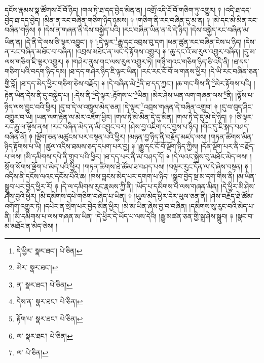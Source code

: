 དངོས་རྣམས་སྣ་ཚོགས་ངོ་བོ་ཉིད། །གལ་ཏེ་ཐ་དད་བྱེད་མིན་ན། །འགྲོ་འདི་ངོ་བོ་གཅིག་ཏུ་འགྱུར། ༈ །འདི་ཐ་དད་བྱེད་ཐ་དད་བྱེད། །མིན་ན་རང་བཞིན་གཅིག་ཉིད་ཉམས། ༈ །གཅིག་ནི་རང་བཞིན་དུ་མ་ན། ༈ །མེ་དང་མེ་མིན་རང་བཞིན་གཉིས། ༈ །དེས་ན་གཞན་ནི་དེས་བསྐྱེད་པའི། །རང་བཞིན་ཡིན་ན་དེ་དེ་ཉིད། །དེས་བསྐྱེད་རང་བཞིན་མ་ཡིན་ན། །དེ་ནི་དེ་ལས་ཅི་ལྟར་འབྱུང་། ༈ །:དེ་ལྟར་\footnote{དེ་ཕྱིར་  སྣར་ཐང་།  པེ་ཅིན། }རྒྱུ་དང་འབྲས་བུ་དག །ཕན་ཚུན་རང་བཞིན་ངེས་པ་ཉིད། །དེས་ན་རང་བཞིན་མཐོང་བ་བཞིན། །འབྲས་མཐོང་ན་ཡང་དེ་རྟོགས་འགྱུར། ༈ །ཆུ་དང་འོ་མ་རུལ་འགྱུར་བཞིན། །དུ་མ་ལས་གཅིག་ཇི་ལྟར་འགྱུར། ༈ །གཤེར་ནུས་གང་ལས་རུལ་འགྱུར་ཏེ། །གཉི་གའང་གཅིག་ཉིད་ཅི་འདི་ནི། །ཐ་དད་གཅིག་པའི་བདག་ཉིད་དམ། །ཐ་དད་གཤེར་ཉིད་ཇི་ལྟར་ཡིན། །རང་རང་ངོ་བོ་ལ་གནས་ཕྱིར། །དེ་ཡི་རང་བཞིན་ཅན་གྱི་བློ། །ཐ་དད་མེད་ཕྱིར་གཅིག་ཅེས་བརྗོད། ༈ །དེ་བཞིན་མེ་\footnote{མེར་  སྣར་ཐང་། }ནི་ཐ་དད་ཀྱང་། །ཆ་གང་གིས་ནི་\footnote{ན་  སྣར་ཐང་།  པེ་ཅིན། }མེར་རྟོགས་པའི། །རྟེན་ཡིན་དེས་ནི་དུ་བསྐྱེད་པ། །:དེས་ནི་\footnote{དེས་ན་  སྣར་ཐང་།  པེ་ཅིན། }དེ་ལྟར་:རྟོགས་པ་\footnote{རྟོག་པ་  སྣར་ཐང་།  པེ་ཅིན། }ཡིན། །མེར་ཤེས་ཡན་ལག་གཞན་ལས་\footnote{ལ་  སྣར་ཐང་།  པེ་ཅིན། }ནི། །ལྟོས་པ་ཉིད་ལས་བྱུང་བའི་ཕྱིར། །དུ་བ་དེ་ལ་འཁྲུལ་མེད་ཅན། །དེ་ལྟར་\footnote{ལ་  པེ་ཅིན། }འབྲས་གཞན་དེ་བཞིན་འགྲུབ། ༈ །དུ་བ་བུད་ཤིང་འགྱུར་བ་ཡི། །ཡན་ལག་རྟེན་ལ་མེར་འཇོག་ཕྱིར། །གལ་ཏེ་མེ་མིན་དེ་དུ་མིན། །གལ་ཏེ་དེ་དུ་མེ་དེ་ཉིད། ༈ །ཅི་ལྟར་རང་རྒྱུ་ལ་ལྟོས་ནས། །རང་བཞིན་མེད་ན་མི་འབྱུང་བར། །ཤེས་བྱ་འཇིག་དང་བྱས་པ་ཉིད། །གོང་དུ་ཇི་སྐད་བཤད་བཞིན་ནོ། ༈ །ལྡོག་ཅན་མཚུངས་པར་བསྟན་པའི་ཕྱིར། །མཉན་བྱ་ཉིད་ནི་བརྗོད་མཛད་ལས། །གཏན་ཚིགས་མིན་ཉིད་རྟོགས་པ་ཡི། །ཚུལ་འདིས་ཐམས་ཅད་དཔག་པར་བྱ། ༈ །རྒྱུ་དང་ངོ་བོ་ལྡོག་ཉིད་ཀྱིས། །དོན་ལྡོག་པར་ནི་བརྗོད་པ་ལས། །མི་དམིགས་དཔེ་ནི་གྲུབ་པའི་ཕྱིར། །ཐ་དད་པར་ནི་མ་བཤད་དོ། ༈ །དེ་ལའང་སྐྱེས་བུ་མཐོང་མེད་ལས། །སྲོག་སོགས་ལྡོག་པ་མེད་པའི་ཕྱིར། །གཏན་ཚིགས་ཐེ་ཚོམ་ཟ་བཤད་པས། །བལྟར་རུང་དོན་ལ་དེ་ཞེས་བསྟན། ༈ །འདིས་ནི་དངོས་ལའང་དངོས་པོའི་ཆ། །ཁས་བླངས་མེད་པར་དགག་པ་ཉིད། །སྒྲུབ་བྱེད་སྔ་མ་དག་གིས་ནི། །མ་ཡིན་སྒྲུབ་པར་བྱེད་ཕྱིར་རོ། ༈ །དེ་ལ་དམིགས་རུང་རྣམས་ཀྱི་ནི། །ཡོད་པ་དམིགས་པ་ལས་གཞན་མིན། །དེ་ཕྱིར་མི་ཤེས་ཤེས་བྱའི་ཕྱིར། །མི་དམིགས་དཔེ་གཅིག་བཞེད་པ་ཡིན། ༈ །ཡུལ་མེད་ཕྱིར་དེར་ཡུལ་ཅན་ནི། །ཤེས་བརྗོད་ཐེ་ཚོམ་འགོག་འགྱུར་ཏེ། །དཔེར་ན་སྲེག་པར་བྱེད་མིན་ཕྱིར། །མེ་མ་ཡིན་ཞེས་བྱ་བ་བཞིན། །དམིགས་སུ་རུང་བའི་མེད་པ་ནི། །མི་དམིགས་པ་ལས་གཞན་མ་ཡིན། །དེ་ཕྱིར་དེ་ཡོད་པ་ལས་དེའི། །རྒྱུ་མཚན་ཅན་གྱི་སྒྲ་ཤེས་སྒྲུབ། ༈ །སྣང་བ་མ་མཐོང་ན་མེད་ཅེས། །
